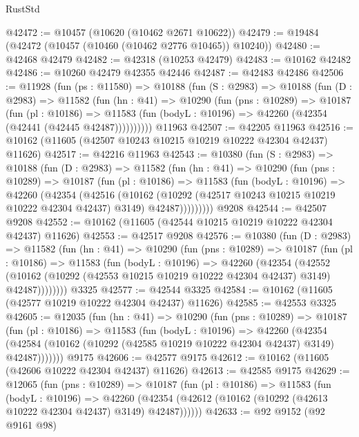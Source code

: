\begin{lexlean}{RustStd}
\begin{coremodule}
@42472 := @10457 (@10620 (@10462 @2671 @10622))
@42479 := @19484 (@42472 (@10457 (@10460 (@10462 @2776 @10465)) @10240))
@42480 := @42468 @42479
@42482 := @42318 (@10253 @42479)
@42483 := @10162 @42482
@42486 := @10260 @42479 @42355 @42446
@42487 := @42483 @42486
@42506 := @11928
    (fun (ps : @11580) =>
    @10188
      (fun (S : @2983) =>
      @10188
        (fun (D : @2983) =>
        @11582
          (fun (hn : @41) =>
          @10290
            (fun (pns : @10289) =>
            @10187
              (fun (pl : @10186) =>
              @11583 (fun (bodyL : @10196) => @42260 (@42354 (@42441 (@42445 @42487))))))))))
    @11963
@42507 := @42205 @11963
@42516 := @10162 (@11605 (@42507 @10243 @10215 @10219 @10222 @42304 @42437) @11626)
@42517 := @42216 @11963
@42543 := @10380
    (fun (S : @2983) =>
    @10188
      (fun (D : @2983) =>
      @11582
        (fun (hn : @41) =>
        @10290
          (fun (pns : @10289) =>
          @10187
            (fun (pl : @10186) =>
            @11583
              (fun (bodyL : @10196) =>
              @42260
                (@42354
                  (@42516
                    (@10162
                      (@10292 (@42517 @10243 @10215 @10219 @10222 @42304 @42437) @3149)
                      @42487)))))))))
    @9208
@42544 := @42507 @9208
@42552 := @10162 (@11605 (@42544 @10215 @10219 @10222 @42304 @42437) @11626)
@42553 := @42517 @9208
@42576 := @10380
    (fun (D : @2983) =>
    @11582
      (fun (hn : @41) =>
      @10290
        (fun (pns : @10289) =>
        @10187
          (fun (pl : @10186) =>
          @11583
            (fun (bodyL : @10196) =>
            @42260
              (@42354
                (@42552
                  (@10162 (@10292 (@42553 @10215 @10219 @10222 @42304 @42437) @3149) @42487))))))))
    @3325
@42577 := @42544 @3325
@42584 := @10162 (@11605 (@42577 @10219 @10222 @42304 @42437) @11626)
@42585 := @42553 @3325
@42605 := @12035
    (fun (hn : @41) =>
    @10290
      (fun (pns : @10289) =>
      @10187
        (fun (pl : @10186) =>
        @11583
          (fun (bodyL : @10196) =>
          @42260
            (@42354
              (@42584 (@10162 (@10292 (@42585 @10219 @10222 @42304 @42437) @3149) @42487)))))))
    @9175
@42606 := @42577 @9175
@42612 := @10162 (@11605 (@42606 @10222 @42304 @42437) @11626)
@42613 := @42585 @9175
@42629 := @12065
    (fun (pns : @10289) =>
    @10187
      (fun (pl : @10186) =>
      @11583
        (fun (bodyL : @10196) =>
        @42260 (@42354 (@42612 (@10162 (@10292 (@42613 @10222 @42304 @42437) @3149) @42487))))))
@42633 := @92 @9152 (@92 @9161 @98)

\end{coremodule}
\end{lexlean}
